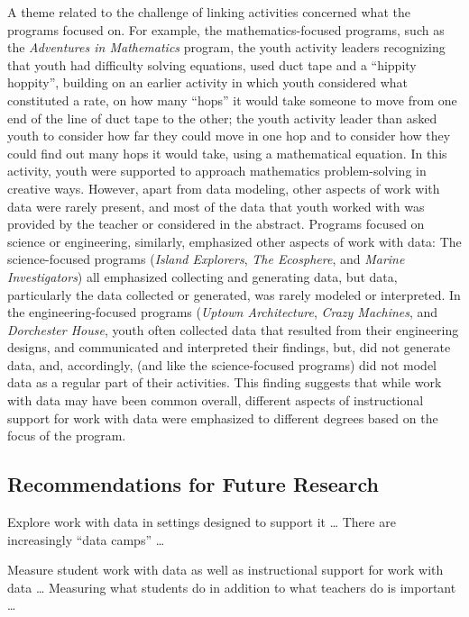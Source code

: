 \documentclass[]{msu-thesis}
\theoremstyle{definition}
\theoremstyle{definition}
\theoremstyle{definition}
\theoremstyle{remark}
\begin{document}
A theme related to the challenge of linking activities concerned what
the programs focused on. For example, the mathematics-focused programs,
such as the \emph{Adventures in Mathematics} program, the youth activity
leaders recognizing that youth had difficulty solving equations, used
duct tape and a ``hippity hoppity'', building on an earlier activity in
which youth considered what constituted a rate, on how many ``hops'' it
would take someone to move from one end of the line of duct tape to the
other; the youth activity leader than asked youth to consider how far
they could move in one hop and to consider how they could find out many
hops it would take, using a mathematical equation. In this activity,
youth were supported to approach mathematics problem-solving in creative
ways. However, apart from data modeling, other aspects of work with data
were rarely present, and most of the data that youth worked with was
provided by the teacher or considered in the abstract. Programs focused
on science or engineering, similarly, emphasized other aspects of work
with data: The science-focused programs (\emph{Island Explorers},
\emph{The Ecosphere}, and \emph{Marine Investigators}) all emphasized
collecting and generating data, but data, particularly the data
collected or generated, was rarely modeled or interpreted. In the
engineering-focused programs (\emph{Uptown Architecture}, \emph{Crazy
Machines}, and \emph{Dorchester House}, youth often collected data that
resulted from their engineering designs, and communicated and
interpreted their findings, but, did not generate data, and,
accordingly, (and like the science-focused programs) did not model data
as a regular part of their activities. This finding suggests that while
work with data may have been common overall, different aspects of
instructional support for work with data were emphasized to different
degrees based on the focus of the program.

\subsection{Recommendations for Future
Research}\label{recommendations-for-future-research}

Explore work with data in settings designed to support it \ldots{} There
are increasingly ``data camps'' \ldots{}

Measure student work with data as well as instructional support for work
with data \ldots{} Measuring what students do in addition to what
teachers do is important \ldots{}
\end{document}
